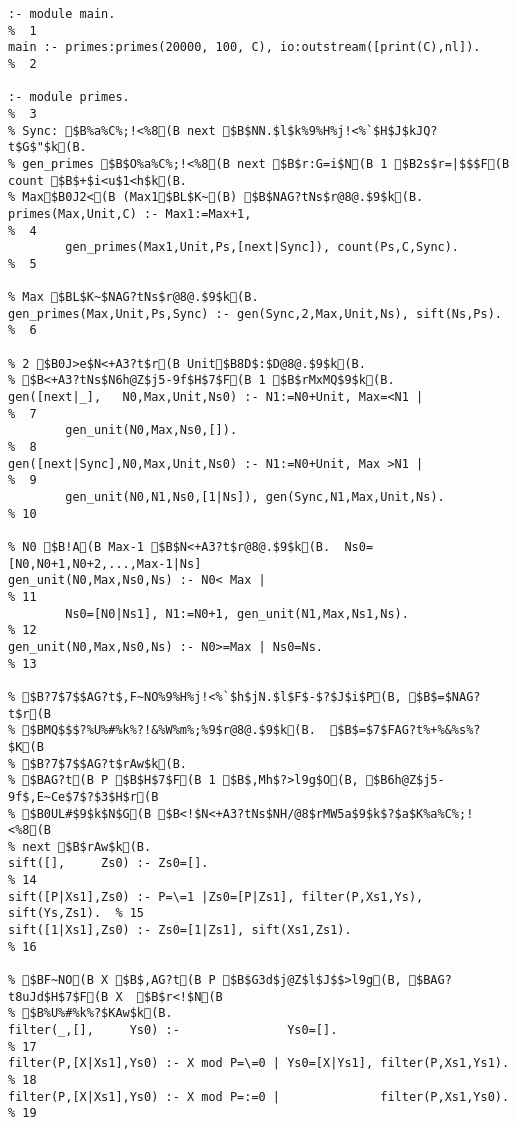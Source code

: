{{{{{{{{{{{\begin{verbatim}
:- module main.                                                           %  1
main :- primes:primes(20000, 100, C), io:outstream([print(C),nl]).        %  2

:- module primes.                                                         %  3
% Sync: $B%a%C%;!<%8(B next $B$NN.$l$k%9%H%j!<%`$H$J$kJQ?t$G$"$k(B.
% gen_primes $B$O%a%C%;!<%8(B next $B$r:G=i$N(B 1 $B2s$r=|$$$F(B count $B$+$i<u$1<h$k(B.
% Max$B0J2<(B (Max1$BL$K~(B) $B$NAG?tNs$r@8@.$9$k(B. 
primes(Max,Unit,C) :- Max1:=Max+1,                                        %  4
        gen_primes(Max1,Unit,Ps,[next|Sync]), count(Ps,C,Sync).           %  5

% Max $BL$K~$NAG?tNs$r@8@.$9$k(B.
gen_primes(Max,Unit,Ps,Sync) :- gen(Sync,2,Max,Unit,Ns), sift(Ns,Ps).     %  6

% 2 $B0J>e$N<+A3?t$r(B Unit$B8D$:$D@8@.$9$k(B.
% $B<+A3?tNs$N6h@Z$j5-9f$H$7$F(B 1 $B$rMxMQ$9$k(B.
gen([next|_],   N0,Max,Unit,Ns0) :- N1:=N0+Unit, Max=<N1 |                %  7
        gen_unit(N0,Max,Ns0,[]).                                          %  8
gen([next|Sync],N0,Max,Unit,Ns0) :- N1:=N0+Unit, Max >N1 |                %  9
        gen_unit(N0,N1,Ns0,[1|Ns]), gen(Sync,N1,Max,Unit,Ns).             % 10

% N0 $B!A(B Max-1 $B$N<+A3?t$r@8@.$9$k(B.  Ns0=[N0,N0+1,N0+2,...,Max-1|Ns]
gen_unit(N0,Max,Ns0,Ns) :- N0< Max |                                      % 11
        Ns0=[N0|Ns1], N1:=N0+1, gen_unit(N1,Max,Ns1,Ns).                  % 12
gen_unit(N0,Max,Ns0,Ns) :- N0>=Max | Ns0=Ns.                              % 13

% $B?7$7$$AG?t$,F~NO%9%H%j!<%`$h$jN.$l$F$-$?$J$i$P(B, $B$=$NAG?t$r(B
% $BMQ$$$?%U%#%k%?!&%W%m%;%9$r@8@.$9$k(B.  $B$=$7$FAG?t%+%&%s%?$K(B
% $B?7$7$$AG?t$rAw$k(B.
% $BAG?t(B P $B$H$7$F(B 1 $B$,Mh$?>l9g$O(B, $B6h@Z$j5-9f$,E~Ce$7$?$3$H$r(B
% $B0UL#$9$k$N$G(B $B<!$N<+A3?tNs$NH/@8$rMW5a$9$k$?$a$K%a%C%;!<%8(B
% next $B$rAw$k(B.
sift([],     Zs0) :- Zs0=[].                                              % 14
sift([P|Xs1],Zs0) :- P=\=1 |Zs0=[P|Zs1], filter(P,Xs1,Ys), sift(Ys,Zs1).  % 15
sift([1|Xs1],Zs0) :- Zs0=[1|Zs1], sift(Xs1,Zs1).                          % 16

% $BF~NO(B X $B$,AG?t(B P $B$G3d$j@Z$l$J$$>l9g(B, $BAG?t8uJd$H$7$F(B X  $B$r<!$N(B
% $B%U%#%k%?$KAw$k(B.
filter(_,[],     Ys0) :-               Ys0=[].                            % 17
filter(P,[X|Xs1],Ys0) :- X mod P=\=0 | Ys0=[X|Ys1], filter(P,Xs1,Ys1).    % 18
filter(P,[X|Xs1],Ys0) :- X mod P=:=0 |              filter(P,Xs1,Ys0).    % 19


\end{verbatim}}}}}}}}}}}}
